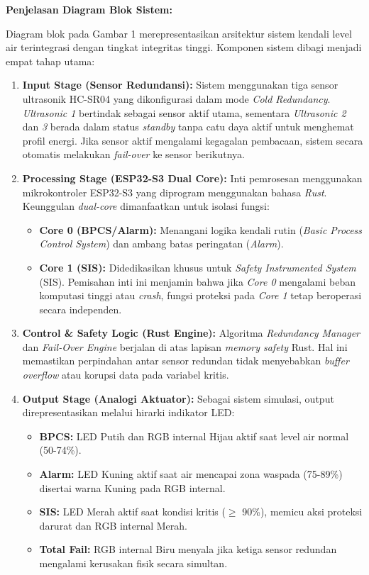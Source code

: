 \documentclass[12pt,a4paper]{article}
\begin{document}
\noindent \textbf{Penjelasan Diagram Blok Sistem:}

Diagram blok pada Gambar 1 merepresentasikan arsitektur sistem kendali level air terintegrasi dengan tingkat integritas tinggi. Komponen sistem dibagi menjadi empat tahap utama:

\begin{enumerate}
    \item \textbf{Input Stage (Sensor Redundansi):} Sistem menggunakan tiga sensor ultrasonik HC-SR04 yang dikonfigurasi dalam mode \textit{Cold Redundancy}. \textit{Ultrasonic 1} bertindak sebagai sensor aktif utama, sementara \textit{Ultrasonic 2} dan \textit{3} berada dalam status \textit{standby} tanpa catu daya aktif untuk menghemat profil energi. Jika sensor aktif mengalami kegagalan pembacaan, sistem secara otomatis melakukan \textit{fail-over} ke sensor berikutnya.
    
    \item \textbf{Processing Stage (ESP32-S3 Dual Core):} Inti pemrosesan menggunakan mikrokontroler ESP32-S3 yang diprogram menggunakan bahasa \textit{Rust}. Keunggulan \textit{dual-core} dimanfaatkan untuk isolasi fungsi:
    \begin{itemize}
        \item \textbf{Core 0 (BPCS/Alarm):} Menangani logika kendali rutin (\textit{Basic Process Control System}) dan ambang batas peringatan (\textit{Alarm}).
        \item \textbf{Core 1 (SIS):} Didedikasikan khusus untuk \textit{Safety Instrumented System} (SIS). Pemisahan inti ini menjamin bahwa jika \textit{Core 0} mengalami beban komputasi tinggi atau \textit{crash}, fungsi proteksi pada \textit{Core 1} tetap beroperasi secara independen.
    \end{itemize}
    
    \item \textbf{Control \& Safety Logic (Rust Engine):} Algoritma \textit{Redundancy Manager} dan \textit{Fail-Over Engine} berjalan di atas lapisan \textit{memory safety} Rust. Hal ini memastikan perpindahan antar sensor redundan tidak menyebabkan \textit{buffer overflow} atau korupsi data pada variabel kritis.
    
    \item \textbf{Output Stage (Analogi Aktuator):} Sebagai sistem simulasi, output direpresentasikan melalui hirarki indikator LED:
    \begin{itemize}
        \item \textbf{BPCS:} LED Putih dan RGB internal Hijau aktif saat level air normal (50-74\%).
        \item \textbf{Alarm:} LED Kuning aktif saat air mencapai zona waspada (75-89\%) disertai warna Kuning pada RGB internal.
        \item \textbf{SIS:} LED Merah aktif saat kondisi kritis ($\geq$ 90\%), memicu aksi proteksi darurat dan RGB internal Merah.
        \item \textbf{Total Fail:} RGB internal Biru menyala jika ketiga sensor redundan mengalami kerusakan fisik secara simultan.
    \end{itemize}
\end{enumerate}
\end{document}
